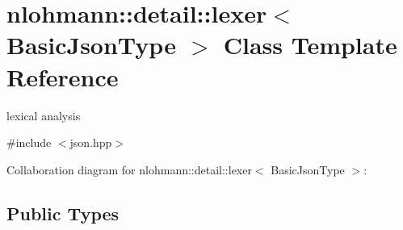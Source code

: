 \hypertarget{classnlohmann_1_1detail_1_1lexer}{}\section{nlohmann\+:\+:detail\+:\+:lexer$<$ Basic\+Json\+Type $>$ Class Template Reference}
\label{classnlohmann_1_1detail_1_1lexer}


lexical analysis  




{\ttfamily \#include $<$json.\+hpp$>$}



Collaboration diagram for nlohmann\+:\+:detail\+:\+:lexer$<$ Basic\+Json\+Type $>$\+:
\subsection*{Public Types}
